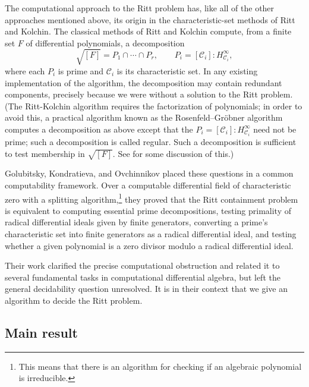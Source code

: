 \documentclass[12pt]{amsart}
\theoremstyle{definition}
\numberwithin{subcase}{cases}
\theoremstyle{remark}
\begin{document}
The computational approach to the Ritt problem has, like all of the other approaches mentioned above, its origin in the characteristic-set methods of Ritt and Kolchin. The classical methods of Ritt and Kolchin compute, from a finite set $F$ of differential polynomials, a decomposition
\[
    \sqrt{[F]}=P_1\cap\cdots\cap P_r,
    \qquad
    P_i=[\mathcal C_i]:H_{\mathcal C_i}^{\infty},
\]
where each $P_i$ is prime and $\mathcal C_i$ is its characteristic set. In any existing implementation of the algorithm, the decomposition may contain redundant components, precisely because we were without a solution to the Ritt problem. (The Ritt-Kolchin algorithm requires the factorization of polynomials; in order to avoid this, a practical algorithm known as the Rosenfeld--Gr\"obner algorithm \cite{Ollivier90, BLOP95} computes a decomposition as above except that the $P_i=[\mathcal C_i]:H_{\mathcal C_i}^{\infty}$ need not be prime; such a decomposition is called regular. Such a decomposition is sufficient to test membership in $\sqrt{[F]}$. See \cite{BoulierLazardOllivierPetitot09} for some discussion of this.)

Golubitsky, Kondratieva, and Ovchinnikov
\cite[Theorem~1]{GolubitskyKondratievaOvchinnikov09} placed these questions in a common computability framework. Over a computable differential field of characteristic zero with a splitting algorithm,\footnote{This means that there is an algorithm for checking if an algebraic polynomial is irreducible.} they proved that the Ritt containment problem is equivalent to computing essential prime decompositions, testing primality of radical differential ideals given by finite generators, converting a prime's characteristic set into finite generators as a radical differential ideal, and testing whether a given polynomial is a zero divisor modulo a radical differential ideal. 

Their work clarified the precise computational obstruction and related it to several fundamental tasks in  computational differential algebra, but left the general decidability question unresolved. It is in their context that we give an algorithm to decide the Ritt problem.

\subsection{Main result}
\end{document}
